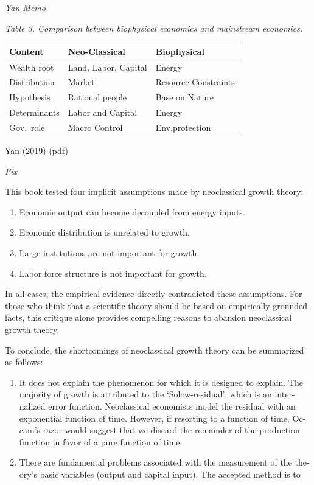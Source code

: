 \documentclass[
]{book}
\providecommand{\tightlist}{%
  \setlength{\itemsep}{0pt}\setlength{\parskip}{0pt}}
\begin{document}
\emph{Yan Memo}

\emph{Table 3. Comparison between biophysical economics and
mainstream economics.}

\begin{longtable}[]{@{}lll@{}}
\toprule
Content & Neo-Classical & Biophysical\tabularnewline
\midrule
\endhead
Wealth root & Land, Labor, Capital & Energy\tabularnewline
Distribution & Market & Resource Constraints\tabularnewline
Hypothesis & Rational people & Base on Nature\tabularnewline
Determinants & Labor and Capital & Energy\tabularnewline
Gov.~role & Macro Control & Env.protection\tabularnewline
\bottomrule
\end{longtable}

\href{https://doi.org/10.1080/01900692.2019.1645691}{Yan (2019)}
\href{pdf/Yan_2019_Biophysical_Economics.pdf}{(pdf)}

\emph{Fix}

This book tested four implicit assumptions made by neoclassical growth theory:

\begin{enumerate}
\def\labelenumi{\arabic{enumi}.}
\tightlist
\item
  Economic output can become decoupled from energy inputs.
\item
  Economic distribution is unrelated to growth.
\item
  Large institutions are not important for growth.
\item
  Labor force structure is not important for growth.
\end{enumerate}

In all cases, the empirical evidence directly contradicted these assumptions. For
those who think that a scientific theory should be based on empirically grounded
facts, this critique alone provides compelling reasons to abandon neoclassical growth
theory.

To conclude, the shortcomings of neoclassical growth theory can be summarized
as follows:

\begin{enumerate}
\def\labelenumi{\arabic{enumi}.}
\item
  It does not explain the phenomenon for which it is designed to explain. The
  majority of growth is attributed to the `Solow-residual', which is an inter-
  nalized error function. Neoclassical economists model the residual with an
  exponential function of time. However, if resorting to a function of time, Oc-
  cam's razor would suggest that we discard the remainder of the production
  function in favor of a pure function of time.
\item
  There are fundamental problems associated with the measurement of the the-
  ory's basic variables (output and capital input). The accepted method is to
\end{enumerate}
\end{document}
